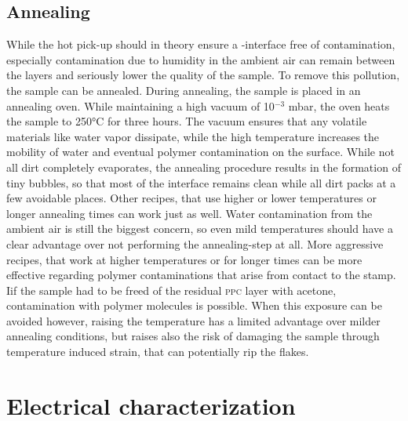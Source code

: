 \subsection{Annealing}

While the hot pick-up should in theory ensure a \hbn-\tmdg interface free of contamination, especially contamination due to humidity in the ambient air can remain between the layers and seriously lower the quality of the sample. To remove this pollution, the sample can be annealed\cite{lin_graphene_2012}. During annealing, the sample is placed in an annealing oven. While maintaining a high vacuum of 10$^{-3}$ mbar, the oven heats the sample to 250°C for three hours. The vacuum ensures that any volatile materials like water vapor dissipate, while the high temperature increases the mobility of water and eventual polymer contamination on the surface. While not all dirt completely evaporates, the annealing procedure results in the formation of tiny bubbles, so that most of the interface remains clean while all dirt packs at a few avoidable places. Other recipes, that use higher or lower temperatures or longer annealing times can work just as well. Water contamination from the ambient air is still the biggest concern, so even mild temperatures should have a clear advantage over not performing the annealing-step at all. 
More aggressive recipes, that work at higher temperatures or for longer times can be more effective regarding polymer contaminations that arise from contact to the stamp. Iif the sample had to be freed of the residual \textsc{ppc} layer with acetone, contamination with polymer molecules is possible. When this exposure can be avoided however, raising the temperature has a limited advantage over milder annealing conditions, but raises also the risk of damaging the sample through temperature induced strain, that can potentially rip the \tmdg flakes. 

\section{Electrical characterization}


